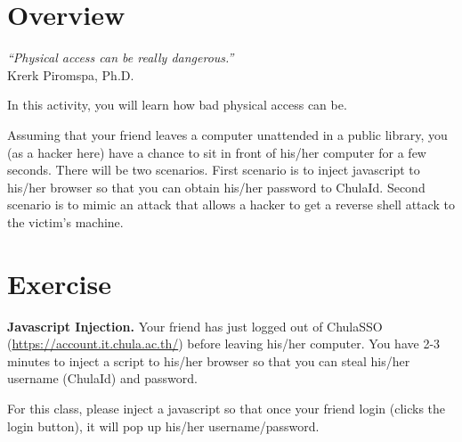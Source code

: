 \documentclass[a4paper, 10pt]{article}
\begin{document}
\subject
{}

\section{Overview}

\begin{flushright}
	\textit{``Physical access can be really dangerous.''} \\
	Krerk Piromspa, Ph.D.
\end{flushright}

\begin{minipage}[c]{0.70\linewidth}
	\noindent In this activity, you will learn how bad physical access can be.

	\myspace

	\noindent Assuming that your friend leaves a computer unattended in a public library, you (as a hacker here) have a chance to sit in front of his/her computer for a few seconds.
	There will be two scenarios.
	First scenario is to inject javascript to his/her browser so that you can obtain his/her password to ChulaId.
	Second scenario is to mimic an attack that allows a hacker to get a reverse shell attack to the victim's machine.
\end{minipage}%
\hfill
\begin{minipage}[c]{0.20\linewidth}
\end{minipage}

\section{Exercise}

\begin{problem}
\textbf{Javascript Injection.}
Your friend has just logged out of ChulaSSO (\url{https://account.it.chula.ac.th/}) before leaving his/her computer.
You have 2-3 minutes to inject a script to his/her browser so that you can steal his/her username (ChulaId) and password.

\par For this class, please inject a javascript so that once your friend login (clicks the login button), it will pop up his/her username/password.

\end{problem}
\end{document}
